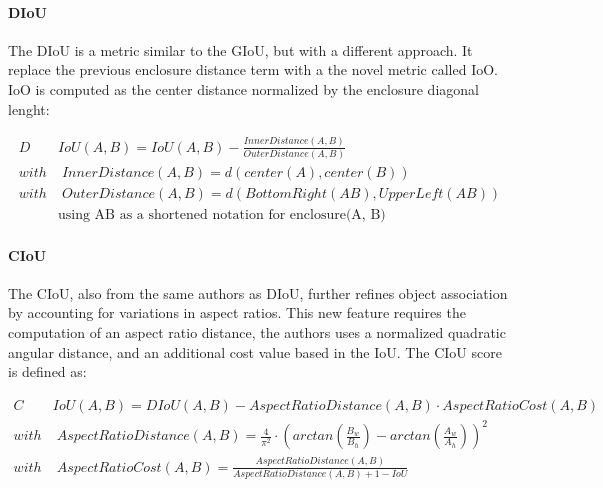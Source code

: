 \paragraph{DIoU} 

{
    The \acl{DIoU}\cite{Zheng_Wang_Liu_Li_Ye_Ren_2020} is a metric similar to the \ac{GIoU}, but with a different approach. 
    It replace the previous enclosure distance term with a the novel metric called \ac{IoO}. 
    \ac{IoO} is computed as the center distance normalized by the enclosure diagonal lenght:
}

\begin{equation}
    \label{eqn:DIoU}
    \begin{split}
        D&IoU(A, B) = IoU(A, B) - \frac{InnerDistance(A, B)}{OuterDistance(A, B)} \\[0.25cm]
        with& \; InnerDistance(A, B) = d(center(A), center(B)) \\[0.25cm]
        with& \; OuterDistance(A, B) = d(BottomRight(AB), UpperLeft(AB)) \\[0.25cm]
        &\text{using AB as a shortened notation for enclosure(A, B)}
    \end{split}
\end{equation}

\paragraph{CIoU}

{
    The \acl{CIoU}\cite{zheng2021ciou}, also from the same authors as \ac{DIoU}, further refines object association by accounting for variations in aspect ratios. 
    This new feature requires the computation of an aspect ratio distance, the authors uses a normalized quadratic angular distance, and an additional cost value based in the IoU. 
    The \ac{CIoU} score is defined as:
}

\begin{equation}
    \label{eqn:CIoU}
    \begin{split}
        C&IoU(A, B) = DIoU(A, B) - AspectRatioDistance(A, B) \cdot AspectRatioCost(A, B) \\[0.25cm]
        with& \; AspectRatioDistance(A, B) = \frac{4}{\pi^2} \cdot \left(arctan\left(\frac{B_{w}}{B_{h}}\right) - arctan\left(\frac{A_{w}}{A_{h}}\right)\right)^{2} \\[0.25cm]
        with& \; AspectRatioCost(A, B) = \frac{AspectRatioDistance(A, B)}{AspectRatioDistance(A, B) + 1 - IoU}
    \end{split}
\end{equation}
